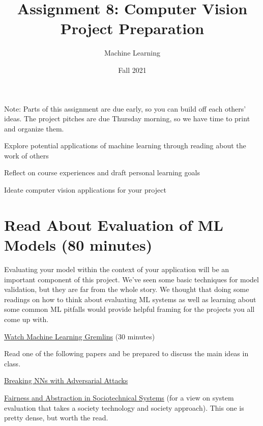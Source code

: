 \documentclass[assignment08_Solutions]{subfiles}
\title{Assignment 8: Computer Vision Project Preparation}
\author{Machine Learning}
\date{Fall 2021}
\begin{document}
\maketitle
\thispagestyle{firstpage}

Note: Parts of this assignment are due early, so you can build off each others' ideas. The project pitches are due Thursday morning, so we have time to print and organize them.
\vspace{2em}



\begin{learningobjectives}
\bi
\item Explore potential applications of machine learning through reading about the work of others
\item Reflect on course experiences and draft personal learning goals
\item Ideate computer vision applications for your project
\ei
\end{learningobjectives}



\section{Read About Evaluation of ML Models (80 minutes)}

\begin{exercise}[(80 minutes)]
Evaluating your model within the context of your application will be an important component of this project.  We've seen some basic techniques for model validation, but they are far from the whole story.  We thought that doing some readings on how to think about evaluating ML systems as well as learning about some common ML pitfalls would provide helpful framing for the projects you all come up with.

\bes
\item \href{https://www.youtube.com/watch?v=tleeC-KlsKA}{Watch Machine Learning Gremlins} (30 minutes)
\item Read one of the following papers and be prepared to discuss the main ideas in class.
\bi
\item \href{https://towardsdatascience.com/breaking-neural-networks-with-adversarial-attacks-f4290a9a45aa}{Breaking NNs with Adversarial Attacks}
\item \href{https://dl.acm.org/citation.cfm?id=3287598}{Fairness and Abstraction in Sociotechnical Systems} (for a view on system evaluation that takes a society technology and society approach).  This one is pretty dense, but worth the read.
\ei
\ees

\end{exercise}
\end{document}
